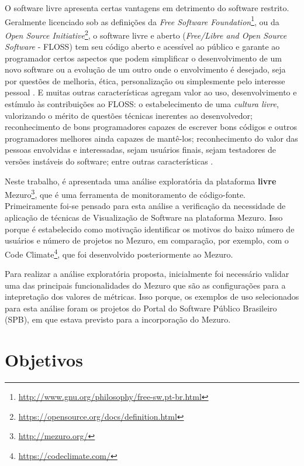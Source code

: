 O software livre apresenta certas vantagens em detrimento do software restrito.
Geralmente licenciado sob as definições da
\textit{Free Software Foundation}\footnote{\url{http://www.gnu.org/philosophy/free-sw.pt-br.html}},
ou da \textit{Open Source Initiative}\footnote{\url{https://opensource.org/docs/definition.html}},
o software livre e aberto (\textit{Free/Libre and Open Source Software} - FLOSS)
tem seu código aberto e acessível ao público e garante ao programador certos
aspectos que podem simplificar o desenvolvimento de um novo software ou a
evolução de um outro onde o envolvimento é desejado, seja por questões de
melhoria, ética, personalização ou simplesmente pelo interesse pessoal
\cite{meirelles2013monitoramento}. E muitas outras características agregam
valor ao uso, desenvolvimento e estímulo às contribuições ao FLOSS: o
estabelecimento de uma \textit{cultura livre}, valorizando o mérito de questões
técnicas inerentes ao desenvolvedor; reconhecimento de bons programadores
capazes de escrever bons códigos e outros programadores melhores ainda capazes
de mantê-los; reconhecimento do valor das pessoas envolvidas e interessadas,
sejam usuários finais, sejam testadores de versões instáveis do software; entre
outras características \cite{raymond1999cathedral}.

Neste trabalho, é apresentada uma análise exploratória da plataforma \textbf{livre}
Mezuro\footnote{\url{http://mezuro.org/}}, que é uma ferramenta de monitoramento
de código-fonte. Primeiramente foi-se pensado para esta análise a verificação da
necessidade de aplicação de técnicas de Visualização de Software na plataforma
Mezuro. Isso porque é estabelecido como motivação identificar os motivos do
baixo número de usuários e número de projetos no Mezuro, em comparação, por
exemplo, com o Code Climate\footnote{\url{https://codeclimate.com/}}, que foi
desenvolvido posteriormente ao Mezuro.

Para realizar a análise exploratória proposta, inicialmente foi necessário
validar uma das principais funcionalidades do Mezuro que são as configurações
para a intepretação dos valores de métricas. Isso porque, os exemplos de uso
selecionados para esta análise foram os projetos do Portal do Software
Público Brasileiro (SPB), em que estava previsto para a incorporação do Mezuro.

\section{Objetivos}

